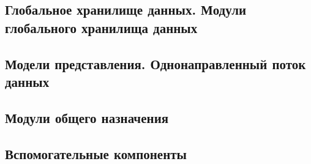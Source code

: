 \subsection{Глобальное хранилище данных. Модули глобального хранилища данных}



\subsection{Модели представления. Однонаправленный поток данных}



\subsection{Модули общего назначения}



\subsection{Вспомогательные компоненты}

\newpage
